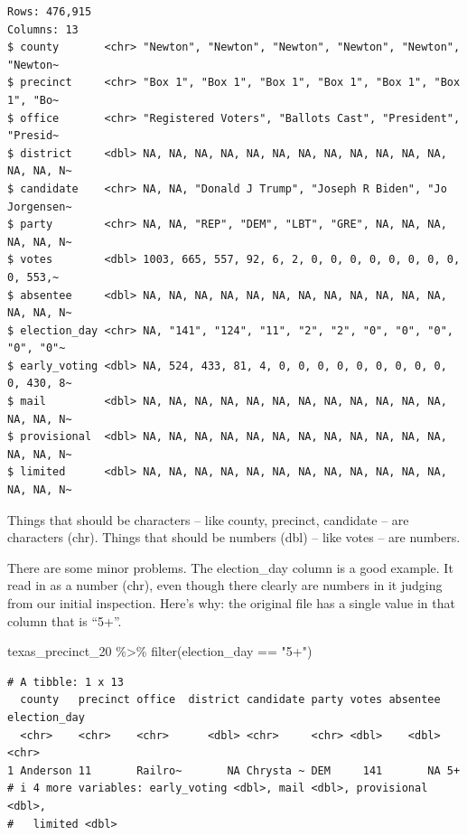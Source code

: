 \documentclass[
  letterpaper,
  DIV=11,
  numbers=noendperiod]{scrreprt}
\newenvironment{Shaded}{\begin{snugshade}}{\end{snugshade}}
\newcommand{\FunctionTok}[1]{\textcolor[rgb]{0.28,0.35,0.67}{#1}}
\newcommand{\NormalTok}[1]{\textcolor[rgb]{0.00,0.23,0.31}{#1}}
\newcommand{\SpecialCharTok}[1]{\textcolor[rgb]{0.37,0.37,0.37}{#1}}
\newcommand{\StringTok}[1]{\textcolor[rgb]{0.13,0.47,0.30}{#1}}
\begin{document}
\begin{verbatim}
Rows: 476,915
Columns: 13
$ county       <chr> "Newton", "Newton", "Newton", "Newton", "Newton", "Newton~
$ precinct     <chr> "Box 1", "Box 1", "Box 1", "Box 1", "Box 1", "Box 1", "Bo~
$ office       <chr> "Registered Voters", "Ballots Cast", "President", "Presid~
$ district     <dbl> NA, NA, NA, NA, NA, NA, NA, NA, NA, NA, NA, NA, NA, NA, N~
$ candidate    <chr> NA, NA, "Donald J Trump", "Joseph R Biden", "Jo Jorgensen~
$ party        <chr> NA, NA, "REP", "DEM", "LBT", "GRE", NA, NA, NA, NA, NA, N~
$ votes        <dbl> 1003, 665, 557, 92, 6, 2, 0, 0, 0, 0, 0, 0, 0, 0, 0, 553,~
$ absentee     <dbl> NA, NA, NA, NA, NA, NA, NA, NA, NA, NA, NA, NA, NA, NA, N~
$ election_day <chr> NA, "141", "124", "11", "2", "2", "0", "0", "0", "0", "0"~
$ early_voting <dbl> NA, 524, 433, 81, 4, 0, 0, 0, 0, 0, 0, 0, 0, 0, 0, 430, 8~
$ mail         <dbl> NA, NA, NA, NA, NA, NA, NA, NA, NA, NA, NA, NA, NA, NA, N~
$ provisional  <dbl> NA, NA, NA, NA, NA, NA, NA, NA, NA, NA, NA, NA, NA, NA, N~
$ limited      <dbl> NA, NA, NA, NA, NA, NA, NA, NA, NA, NA, NA, NA, NA, NA, N~
\end{verbatim}

Things that should be characters -- like county, precinct, candidate --
are characters (chr). Things that should be numbers (dbl) -- like votes
-- are numbers.

There are some minor problems. The election\_day column is a good
example. It read in as a number (chr), even though there clearly are
numbers in it judging from our initial inspection. Here's why: the
original file has a single value in that column that is ``5+''.

\begin{Shaded}
\begin{Highlighting}[]
\NormalTok{texas\_precinct\_20 }\SpecialCharTok{\%\textgreater{}\%} \FunctionTok{filter}\NormalTok{(election\_day }\SpecialCharTok{==} \StringTok{"5+"}\NormalTok{)}
\end{Highlighting}
\end{Shaded}

\begin{verbatim}
# A tibble: 1 x 13
  county   precinct office  district candidate party votes absentee election_day
  <chr>    <chr>    <chr>      <dbl> <chr>     <chr> <dbl>    <dbl> <chr>       
1 Anderson 11       Railro~       NA Chrysta ~ DEM     141       NA 5+          
# i 4 more variables: early_voting <dbl>, mail <dbl>, provisional <dbl>,
#   limited <dbl>
\end{verbatim}
\end{document}
